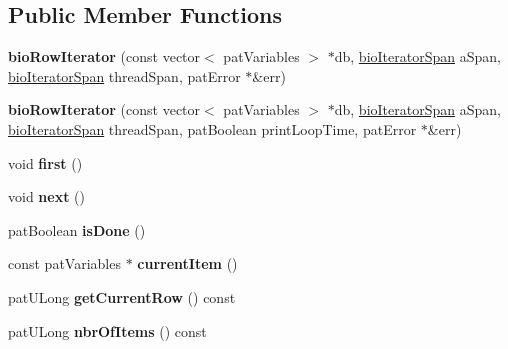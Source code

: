 \subsection*{Public Member Functions}
\begin{DoxyCompactItemize}
\item 
\mbox{\label{classbio_row_iterator_a9b4847d79ecff3ee7ea2a845ffa81ca9}} 
{\bfseries bio\+Row\+Iterator} (const vector$<$ pat\+Variables $>$ $\ast$db, \hyperlink{classbio_iterator_span}{bio\+Iterator\+Span} a\+Span, \hyperlink{classbio_iterator_span}{bio\+Iterator\+Span} thread\+Span, pat\+Error $\ast$\&err)
\item 
\mbox{\label{classbio_row_iterator_a1b01de1bc958c45a0bee1eb48ff1b4f9}} 
{\bfseries bio\+Row\+Iterator} (const vector$<$ pat\+Variables $>$ $\ast$db, \hyperlink{classbio_iterator_span}{bio\+Iterator\+Span} a\+Span, \hyperlink{classbio_iterator_span}{bio\+Iterator\+Span} thread\+Span, pat\+Boolean print\+Loop\+Time, pat\+Error $\ast$\&err)
\item 
\mbox{\label{classbio_row_iterator_a66608cbe638a5934597e13fd98da4740}} 
void {\bfseries first} ()
\item 
\mbox{\label{classbio_row_iterator_a557629aeeb1bbad1067c6b351f74a556}} 
void {\bfseries next} ()
\item 
\mbox{\label{classbio_row_iterator_a75a1e1d6579527730cc6164531154f75}} 
pat\+Boolean {\bfseries is\+Done} ()
\item 
\mbox{\label{classbio_row_iterator_a7d751836100e12314a10a411dd843d4b}} 
const pat\+Variables $\ast$ {\bfseries current\+Item} ()
\item 
\mbox{\label{classbio_row_iterator_a4db8e13bf09144d085566b6eded84315}} 
pat\+U\+Long {\bfseries get\+Current\+Row} () const
\item 
\mbox{\label{classbio_row_iterator_a81c96f048864ae76b308381ab4e30dad}} 
pat\+U\+Long {\bfseries nbr\+Of\+Items} () const
\end{DoxyCompactItemize}
